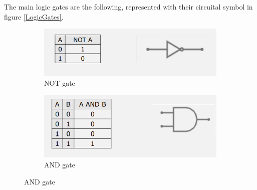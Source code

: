 \documentclass{article}
\begin{document}
\vspace{3mm}

The main logic gates are the following, represented with their circuital symbol in figure \ref{LogicGates}.

\begin{figure}[h]

    \centering
    \begin{subfigure}{.49\textwidth}
        \centering
        \includegraphics[width=\linewidth]{IM_NOT.PNG}
        \caption{NOT gate}
        \label{NOT}
    \end{subfigure}
    \hfill
    \begin{subfigure}{.49\textwidth}
        \centering
        \includegraphics[width=\linewidth]{IM_AND.PNG}
        \caption{AND gate}
        \label{AND}        
    \end{subfigure}
    

\end{figure}
\end{document}

